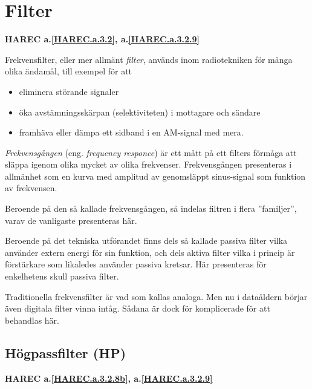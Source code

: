 \section{Filter}
\textbf{HAREC a.\ref{HAREC.a.3.2}\label{myHAREC.a.3.2}, a.\ref{HAREC.a.3.2.9}\label{myHAREC.a.3.2.9}}

Frekvensfilter, eller mer allmänt \emph{filter}, används inom radiotekniken för
många olika ändamål, till exempel för att
\begin{itemize}
  \item eliminera störande signaler
  \item öka avstämningsskärpan (selektiviteten) i mottagare och sändare
  \item framhäva eller dämpa ett sidband i en AM-signal med mera.
\end{itemize}

\emph{Frekvensgången} (eng. \emph{frequency responce}) är ett mått på ett
filters förmåga att släppa igenom olika mycket av olika frekvenser.
Frekvensgången presenteras i allmänhet som en kurva med amplitud av genomsläppt
sinus-signal som funktion av frekvensen.

Beroende på den så kallade frekvensgången, så indelas filtren i flera
''familjer'', varav de vanligaste presenteras här.

Beroende på det tekniska utförandet finns dels så kallade passiva filter vilka
använder extern energi för sin funktion, och dels aktiva filter vilka i princip
är förstärkare som likaledes använder passiva kretsar.
Här presenteras för enkelhetens skull passiva filter.

Traditionella frekvensfilter är vad som kallas analoga.
Men nu i dataåldern börjar även digitala filter vinna intåg.
Sådana är dock för komplicerade för att behandlas här.

\subsection{Högpassfilter (HP)}
\textbf{HAREC
  a.\ref{HAREC.a.3.2.8b}\label{myHAREC.a.3.2.8b},
  a.\ref{HAREC.a.3.2.9}\label{myHAREC.a.3.2.9a}
}


